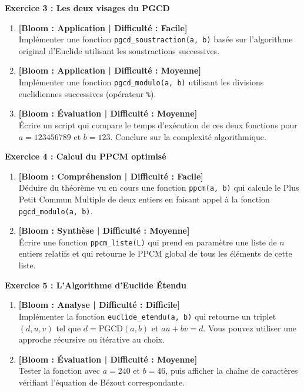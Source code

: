 \vspace{0.5cm}

\noindent\textbf{Exercice 3 : Les deux visages du PGCD} 
\begin{enumerate}
    \item \textbf{[Bloom : Application | Difficulté : Facile]} \\
    Implémenter une fonction \texttt{pgcd\_soustraction(a, b)} basée sur l'algorithme original d'Euclide utilisant les soustractions successives.
    \item \textbf{[Bloom : Application | Difficulté : Moyenne]} \\
    Implémenter une fonction \texttt{pgcd\_modulo(a, b)} utilisant les divisions euclidiennes successives (opérateur \texttt{\%}). 
    \item \textbf{[Bloom : Évaluation | Difficulté : Moyenne]} \\
    Écrire un script qui compare le temps d'exécution de ces deux fonctions pour $a = 123456789$ et $b = 123$. Conclure sur la complexité algorithmique.
\end{enumerate}

\vspace{0.5cm}

\noindent\textbf{Exercice 4 : Calcul du PPCM optimisé} 
\begin{enumerate}
    \item \textbf{[Bloom : Compréhension | Difficulté : Facile]} \\
    Déduire du théorème vu en cours une fonction \texttt{ppcm(a, b)} qui calcule le Plus Petit Commun Multiple de deux entiers en faisant appel à la fonction \texttt{pgcd\_modulo(a, b)}.
    \item \textbf{[Bloom : Synthèse | Difficulté : Moyenne]} \\
    Écrire une fonction \texttt{ppcm\_liste(L)} qui prend en paramètre une liste de $n$ entiers relatifs et qui retourne le PPCM global de tous les éléments de cette liste.
\end{enumerate}

\vspace{0.5cm}

\noindent\textbf{Exercice 5 : L'Algorithme d'Euclide Étendu} 
\begin{enumerate}
    \item \textbf{[Bloom : Analyse | Difficulté : Difficile]} \\
    Implémenter la fonction \texttt{euclide\_etendu(a, b)} qui retourne un triplet $(d, u, v)$ tel que $d = \text{PGCD}(a, b)$ et $au + bv = d$. Vous pouvez utiliser une approche récursive ou itérative au choix.
    \item \textbf{[Bloom : Évaluation | Difficulté : Moyenne]} \\
    Tester la fonction avec $a = 240$ et $b = 46$, puis afficher la chaîne de caractères vérifiant l'équation de Bézout correspondante.
\end{enumerate}

